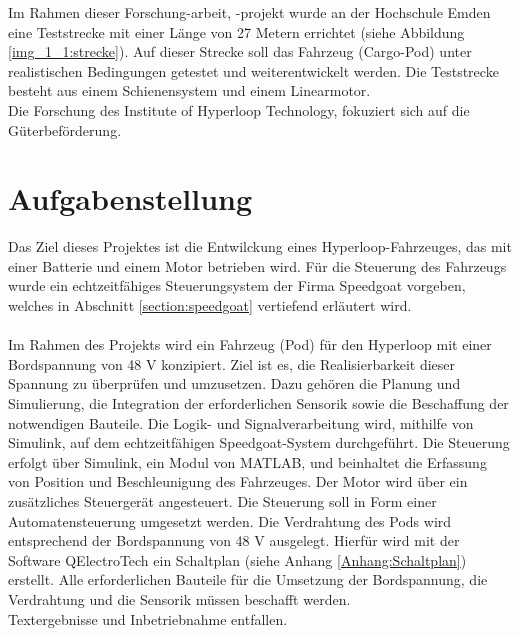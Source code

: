 Im Rahmen dieser Forschung-arbeit, -projekt wurde an der Hochschule Emden eine Teststrecke mit einer Länge von 27 Metern errichtet (siehe Abbildung \ref{img_1_1:strecke}). Auf dieser Strecke soll das Fahrzeug (Cargo-Pod) unter realistischen Bedingungen getestet und weiterentwickelt werden.
Die Teststrecke besteht aus einem Schienensystem und einem Linearmotor.\\
Die Forschung des \frqq Institute of Hyperloop Technology\flqq, fokuziert sich auf die Güterbeförderung.
\newpage




\section{Aufgabenstellung}
\label{section:Aufgabenstellung}
Das Ziel dieses Projektes ist die Entwilckung eines Hyperloop-Fahrzeuges, das mit einer Batterie und einem Motor betrieben wird. Für die Steuerung des Fahrzeugs wurde ein echtzeitfähiges Steuerungsystem der Firma Speedgoat vorgeben, welches in Abschnitt \ref{section:speedgoat} vertiefend erläutert wird.\\ \ \\

Im Rahmen des Projekts wird ein Fahrzeug (Pod) für den Hyperloop mit einer Bordspannung von 48 V konzipiert. Ziel ist es, die Realisierbarkeit dieser Spannung zu überprüfen und umzusetzen. Dazu gehören die Planung und Simulierung, die Integration der erforderlichen Sensorik sowie die Beschaffung der notwendigen Bauteile. Die Logik- und Signalverarbeitung wird, mithilfe von Simulink, auf dem echtzeitfähigen Speedgoat-System durchgeführt.
Die Steuerung erfolgt über Simulink, ein Modul von MATLAB, und beinhaltet die Erfassung von Position und Beschleunigung des Fahrzeuges. Der Motor wird über ein zusätzliches Steuergerät angesteuert. Die Steuerung soll in Form einer Automatensteuerung umgesetzt werden.
Die Verdrahtung des Pods wird entsprechend der Bordspannung von 48 V ausgelegt. Hierfür wird mit der Software QElectroTech ein Schaltplan (siehe Anhang \ref{Anhang:Schaltplan}) erstellt.
Alle erforderlichen Bauteile für die Umsetzung der Bordspannung, die Verdrahtung und die Sensorik müssen beschafft werden.\\
Textergebnisse und Inbetriebnahme entfallen.



